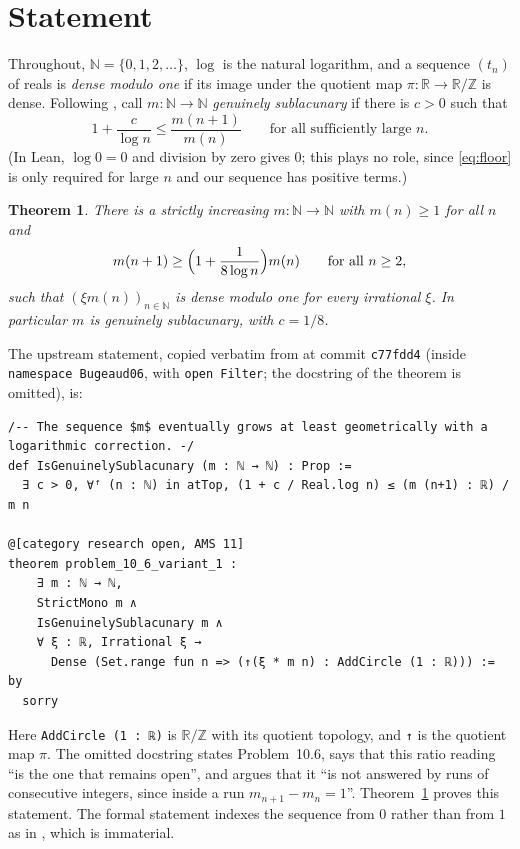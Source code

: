 \documentclass[11pt]{amsart}
\theoremstyle{plain}
\newtheorem{theorem}{Theorem}
\theoremstyle{definition}
\newcommand{\N}{\mathbb{N}}
\newcommand{\R}{\mathbb{R}}
\newcommand{\Z}{\mathbb{Z}}
\begin{document}
\section{Statement}\label{sec:statement}

Throughout, $\N=\{0,1,2,\dots\}$, $\log$ is the natural logarithm, and a sequence $(t_n)$ of reals is \emph{dense modulo one} if its image under the quotient map $\pi\colon\R\to\R/\Z$ is dense.
Following \cite{FC}, call $m\colon\N\to\N$ \emph{genuinely sublacunary} if there is $c>0$ such that
\begin{equation}\label{eq:floor}
  1+\frac{c}{\log n}\le\frac{m(n+1)}{m(n)}\qquad\text{for all sufficiently large }n.
\end{equation}
(In Lean, $\log 0=0$ and division by zero gives $0$; this plays no role, since \eqref{eq:floor} is only required for large $n$ and our sequence has positive terms.)

\begin{theorem}\label{thm:main}
There is a strictly increasing $m\colon\N\to\N$ with $m(n)\ge1$ for all $n$ and
\[
  m(n+1)\ge\Bigl(1+\frac{1}{8\log n}\Bigr)m(n)\qquad\text{for all }n\ge2,
\]
such that $(\xi m(n))_{n\in\N}$ is dense modulo one for every irrational $\xi$. In particular $m$ is genuinely sublacunary, with $c=1/8$.
\end{theorem}

The upstream statement, copied verbatim from  at commit \texttt{c77fdd4} (inside \texttt{namespace Bugeaud06}, with \texttt{open Filter}; the docstring of the theorem is omitted), is:
\begin{lstlisting}
/-- The sequence $m$ eventually grows at least geometrically with a logarithmic correction. -/
def IsGenuinelySublacunary (m : ℕ → ℕ) : Prop :=
  ∃ c > 0, ∀ᶠ (n : ℕ) in atTop, (1 + c / Real.log n) ≤ (m (n+1) : ℝ) / m n

@[category research open, AMS 11]
theorem problem_10_6_variant_1 :
    ∃ m : ℕ → ℕ,
    StrictMono m ∧
    IsGenuinelySublacunary m ∧
    ∀ ξ : ℝ, Irrational ξ →
      Dense (Set.range fun n => (↑(ξ * m n) : AddCircle (1 : ℝ))) := by
  sorry
\end{lstlisting}
Here \texttt{AddCircle (1 : ℝ)} is $\R/\Z$ with its quotient topology, and \texttt{↑} is the quotient map $\pi$.
The omitted docstring states Problem~10.6, says that this ratio reading ``is the one that remains open'', and argues that it ``is not answered by runs of consecutive integers, since inside a run $m_{n+1}-m_n=1$''.
Theorem~\ref{thm:main} proves this statement. The formal statement indexes the sequence from $0$ rather than from $1$ as in \cite{Bug12}, which is immaterial.
\end{document}
